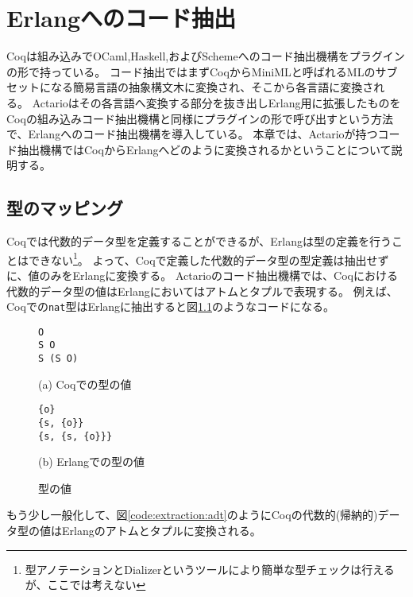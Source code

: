 \chapter{Erlangへのコード抽出}
\label{chapter:extraction}

Coqは組み込みでOCaml,Haskell,およびSchemeへのコード抽出機構をプラグインの形で持っている。
コード抽出ではまずCoqからMiniMLと呼ばれるMLのサブセットになる簡易言語の抽象構文木に変換され、そこから各言語に変換される。
Actarioはその各言語へ変換する部分を抜き出しErlang用に拡張したものをCoqの組み込みコード抽出機構と同様にプラグインの形で呼び出すという方法で、Erlangへのコード抽出機構を導入している。
本章では、Actarioが持つコード抽出機構ではCoqからErlangへどのように変換されるかということについて説明する。

\section{型のマッピング}

Coqでは代数的データ型を定義することができるが、Erlangは型の定義を行うことはできない\footnote{型アノテーションとDializerというツールにより簡単な型チェックは行えるが、ここでは考えない}。
よって、Coqで定義した代数的データ型の型定義は抽出せずに、値のみをErlangに変換する。
Actarioのコード抽出機構では、Coqにおける代数的データ型の値はErlangにおいてはアトムとタプルで表現する。
例えば、Coqでの\texttt{nat}型はErlangに抽出すると図\ref{code:extraction:datamapping-nat}のようなコードになる。

\begin{figure}\centering
\begin{minipage}{0.4\textwidth}\centering
\begin{lstlisting}[frame=single,numbers=none,xleftmargin=0pt]
O
S O
S (S O)
\end{lstlisting}
(a) Coqでの型の値
\end{minipage}
\hspace*{3ex}
\begin{minipage}{0.4\textwidth}\centering
\begin{lstlisting}[frame=single,numbers=none,xleftmargin=0pt]
{o}
{s, {o}}
{s, {s, {o}}}
\end{lstlisting}
(b) Erlangでの型の値
\end{minipage}
\label{code:extraction:datamapping-nat}
\caption{型の値}
\end{figure}

もう少し一般化して、図\ref{code:extraction:adt}のようにCoqの代数的(帰納的)データ型の値はErlangのアトムとタプルに変換される。

